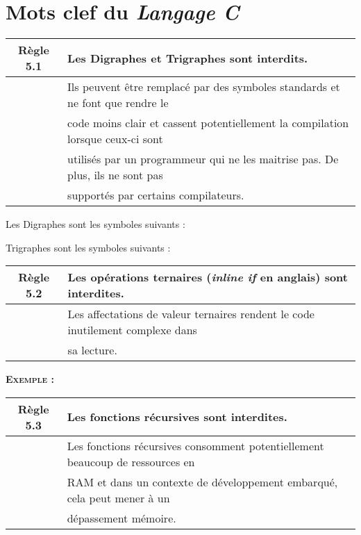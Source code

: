 \section{Mots clef du \textit{Langage C}}

\begin{center}
\begin{tabular}{|c l|}
\hline
\rowcolor{red!10}\textbf{Règle 5.1} & Les Digraphes et Trigraphes sont interdits. \\ \hline
 & Ils peuvent être remplacé par des symboles standards et ne font que rendre le \\
 & code moins clair et cassent potentiellement la compilation lorsque ceux-ci sont \\
 & utilisés par un programmeur qui ne les maitrise pas. De plus, ils ne sont pas \\
 & supportés par certains compilateurs. \\ \hline
\hline
\end{tabular}
\end{center}

\smallskip 

Les Digraphes sont les symboles suivants :
\smallskip 



Trigraphes sont les symboles suivants :
\smallskip 


\medskip

\begin{center}
\begin{tabular}{|c l|}
\hline
\rowcolor{red!10}\textbf{Règle 5.2} & Les opérations ternaires (\textit{inline if} en anglais) sont interdites. \\ \hline
 & Les affectations de valeur ternaires rendent le code inutilement complexe dans \\
 & sa lecture.\\ \hline
\hline
\end{tabular}
\end{center}

\pagebreak

\begin{large}
\textbf{\textsc{Exemple :}}
\end{large}
\smallskip


\medskip

\begin{center}
\begin{tabular}{|c l|}
\hline
\rowcolor{red!10}\textbf{Règle 5.3} & Les fonctions récursives sont interdites. \\ \hline
 & Les fonctions récursives consomment potentiellement beaucoup de ressources en \\
 & RAM et dans un contexte de développement embarqué, cela peut mener à un \\
 & dépassement mémoire.\\ \hline
\hline
\end{tabular}
\end{center}

